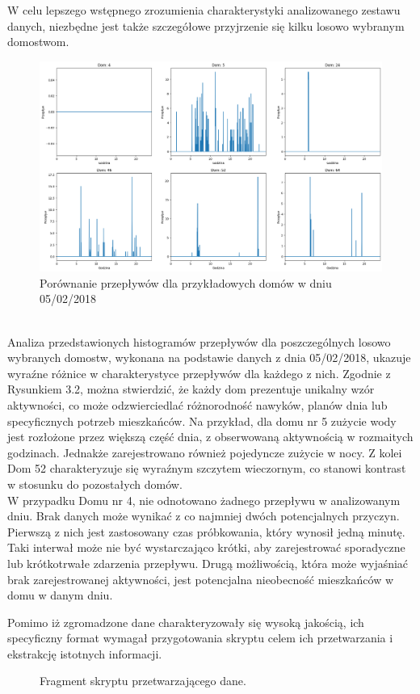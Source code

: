 \documentclass[a4paper,twoside,12pt]{book}
\begin{document}
\newpage
W celu lepszego wstępnego zrozumienia charakterystyki analizowanego zestawu danych, niezbędne jest także szczegółowe przyjrzenie się kilku losowo wybranym domostwom.\\
\begin{figure}[!h]
	\centering
	\includegraphics[width=1\textwidth]{img/Dane_nowe_compare.png}
	\caption{Porównanie przepływów dla przykładowych domów w dniu 05/02/2018}
	\label{fig:etykieta-rysunku}
\end{figure}\\
Analiza przedstawionych histogramów przepływów dla poszczególnych losowo wybranych domostw, wykonana na podstawie danych z dnia 05/02/2018, ukazuje wyraźne różnice w charakterystyce przepływów dla każdego z nich. Zgodnie z Rysunkiem 3.2, można stwierdzić, że każdy dom prezentuje unikalny wzór aktywności, co może odzwierciedlać różnorodność nawyków, planów dnia lub specyficznych potrzeb mieszkańców. Na przykład, dla domu nr 5 zużycie wody jest rozłożone przez większą część dnia, z obserwowaną aktywnością w rozmaitych godzinach. Jednakże zarejestrowano również pojedyncze zużycie w nocy. Z kolei Dom 52 charakteryzuje się wyraźnym szczytem wieczornym, co stanowi kontrast w stosunku do pozostałych domów.\\W przypadku Domu nr 4, nie odnotowano żadnego przepływu w analizowanym dniu. Brak danych może wynikać z co najmniej dwóch potencjalnych przyczyn. Pierwszą z nich jest zastosowany czas próbkowania, który wynosił jedną minutę. Taki interwał może nie być wystarczająco krótki, aby zarejestrować sporadyczne lub krótkotrwałe zdarzenia przepływu. Drugą możliwością, która może wyjaśniać brak zarejestrowanej aktywności, jest potencjalna nieobecność mieszkańców w domu w danym dniu.

\newpage
Pomimo iż zgromadzone dane charakteryzowały się wysoką jakością, ich specyficzny format wymagał przygotowania skryptu celem ich przetwarzania i ekstrakcję istotnych informacji.\\
\begin{figure}[!h]
	\centering
	
	\caption{Fragment skryptu przetwarzającego dane.}
	\label{fig:pseudokod:listings}
\end{figure}
\end{document}
